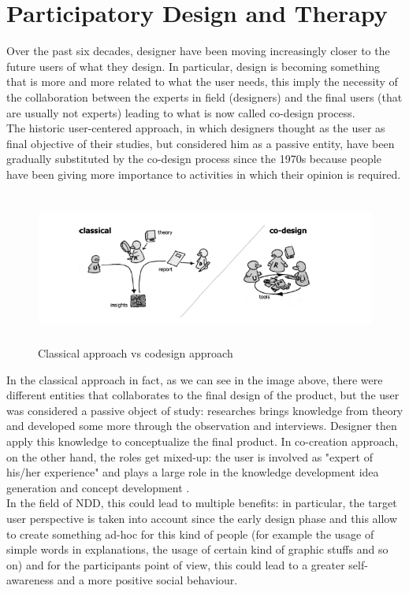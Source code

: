 \section{Participatory Design and Therapy}
Over the past six decades, designer have been moving increasingly closer to the future users of what they design. In particular, design is becoming something that is more and more related to what the user needs, this imply the necessity of the collaboration between the experts in field (designers) and the final users (that are usually not experts) leading to what is now called co-design process.\\
The historic user-centered approach, in which designers thought as the user as final objective of their studies, but considered him as a passive entity, have been gradually substituted by the co-design process since the 1970s because people have been giving more importance to activities in which their opinion is required.
\begin{figure}[H]
\centering
\includegraphics[width=16cm, height=5cm]{immagini/codesign.png}
\caption{Classical approach vs codesign approach}\label{fig:codesign}
\end{figure}
In the classical approach in fact, as we can see in the image above, there were different entities that collaborates to the final design of the product, but the user was considered a passive object of study: researches brings knowledge from theory and developed some more through the observation and interviews. Designer then apply this knowledge to conceptualize the final product. 
In co-creation approach, on the other hand, the roles get mixed-up: the user is involved as "expert of his/her experience" and plays a large role in the knowledge development idea generation and concept development \cite{Elizabeth}.\\
In the field of NDD, this could lead to multiple benefits: in particular, the target user perspective is taken into account since the early design phase and this allow to create something ad-hoc for this kind of people (for example the usage of simple words in explanations, the usage of certain kind of graphic stuffs and so on) and for the participants point of view, this could lead to a greater self-awareness and a more positive social behaviour.



